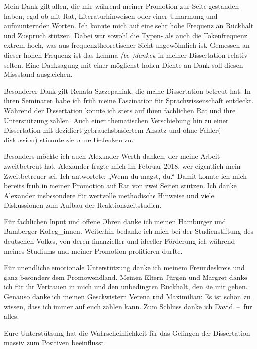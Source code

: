 \addchap{\lsAcknowledgementTitle} 

Mein Dank gilt allen, die mir während meiner Promotion zur Seite gestanden haben, egal ob mit Rat, Literaturhinweisen oder einer Umarmung und aufmunternden Worten. Ich konnte mich auf eine sehr hohe Frequenz an Rückhalt und Zuspruch stützen. Dabei war sowohl die Typen- als auch die Tokenfrequenz extrem hoch, was aus frequenztheoretischer Sicht ungewöhnlich ist.  Gemessen an dieser hohen Frequenz ist das Lemma \textit{(be-)danken} in meiner Dissertation relativ selten. Eine Danksagung mit einer möglichst hohen Dichte an Dank soll diesen Missstand ausgleichen.

Besonderer Dank gilt Renata Szczepaniak, die meine Dissertation betreut hat. In ihren Seminaren habe ich früh meine Faszination für Sprachwissenschaft entdeckt. Während der Dissertation konnte ich stets auf ihren fachlichen Rat und ihre Unterstützung zählen. Auch einer thematischen Verschiebung hin zu einer Dissertation mit dezidiert gebrauchsbasiertem Ansatz und ohne Fehler(-diskussion) stimmte sie ohne Bedenken zu.

Besonders möchte ich auch Alexander Werth danken, der meine Arbeit zweitbetreut hat. Alexander fragte mich im Februar 2018, wer eigentlich mein Zweitbetreuer sei. Ich antwortete: „Wenn du magst, du.“ Damit konnte ich mich bereits früh in meiner Promotion auf Rat von zwei Seiten stützen. Ich danke Alexander insbesondere für wertvolle methodische Hinweise und viele Diskussionen zum Aufbau der Reaktionszeitstudien.

Für fachlichen Input und offene Ohren danke ich meinen Hamburger und Bamberger Kolleg\_innen. Weiterhin bedanke ich mich bei der Studienstiftung des deutschen Volkes, von deren finanzieller und ideeller Förderung ich während meines Studiums und meiner Promotion profitieren durfte.

Für unendliche emotionale Unterstützung danke ich meinem Freundeskreis und ganz besonders dem Promowendland.  Meinen Eltern Jürgen und Margret danke ich für ihr Vertrauen in mich und den unbedingten Rückhalt, den sie mir geben. Genauso danke ich meinen Geschwistern Verena und Maximilian: Es ist schön zu wissen, dass ich immer auf euch zählen kann. Zum Schluss danke ich David~–~für alles.

Eure Unterstützung hat die Wahrscheinlichkeit für das Gelingen der Dissertation massiv zum Positiven beeinflusst. 
